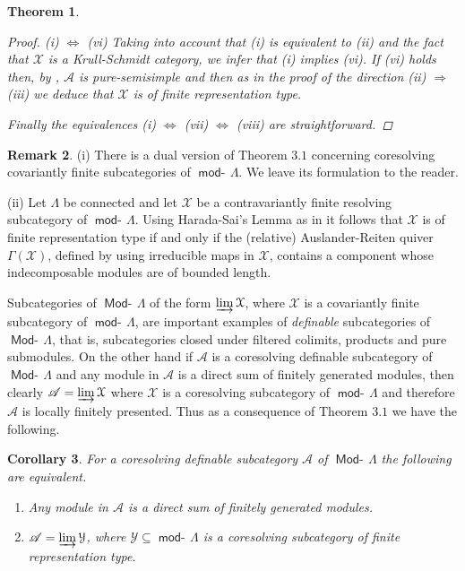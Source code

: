 \documentclass[oneside, a4paper,reqno]{amsart}
\numberwithin{equation}{section}
\newtheorem{thm}{Theorem}[section]
\newtheorem{cor}[thm]{Corollary}
\theoremstyle{definition}
\newtheorem{rem}[thm]{Remark}
\begin{document}
\begin{thm}
\begin{proof}
(i) $\Leftrightarrow$ (vi) Taking into account that  (i) is
equivalent to (ii) and the fact that ${\mathcal X}$ is a Krull-Schmidt
category, we infer that (i) implies (vi). If (vi) holds then, by
\cite[Corollary 2.7]{Krause:memoirs}, ${\mathscr A}$ is pure-semisimple and
then as in the proof of the direction (ii) $\Rightarrow$ (iii) we
deduce that ${\mathcal X}$ is of finite representation type.

Finally the equivalences  (i) $\Leftrightarrow$ (vii)
$\Leftrightarrow$ (viii) are straightforward.
\end{proof}
\end{thm}

\begin{rem} (i) There is a dual version of Theorem $3.1$ concerning
coresolving covariantly finite subcategories of $\operatorname*{\mathsf{mod}-\!}\Lambda$. We
leave its formulation to the reader.

(ii) Let $\Lambda$ be connected and let ${\mathcal X}$ be a contravariantly
finite resolving subcategory of $\operatorname*{\mathsf{mod}-\!}\Lambda$. Using Harada-Sai's
Lemma as in \cite{Ringel:quasi} it follows that ${\mathcal X}$ is of finite
representation type if and only if the (relative) Auslander-Reiten
quiver $\Gamma({\mathcal X})$, defined by using irreducible maps in ${\mathcal X}$,
contains a component whose indecomposable modules are of bounded
length.
\end{rem}

Subcategories of $\operatorname*{\mathsf{Mod}-\!}\Lambda$ of the form $\operatorname*{\varinjlim}{\mathcal X}$, where ${\mathcal X}$ is
a covariantly finite subcategory of $\operatorname*{\mathsf{mod}-\!}\Lambda$, are important
examples of {\em definable} subcategories of $\operatorname*{\mathsf{Mod}-\!}\Lambda$, that is,
subcategories closed under filtered colimits, products and pure
submodules.  On the other hand if ${\mathscr A}$ is a coresolving definable
subcategory of $\operatorname*{\mathsf{Mod}-\!}\Lambda$ and any module in ${\mathscr A}$ is a direct sum
of finitely generated modules, then clearly ${\mathscr A} = \operatorname*{\varinjlim}{\mathcal X}$ where
${\mathcal X}$ is a coresolving subcategory of $\operatorname*{\mathsf{mod}-\!}\Lambda$ and therefore
${\mathscr A}$ is locally finitely presented. Thus as a consequence of Theorem
$3.1$ we have the following.

\begin{cor} For a coresolving definable subcategory ${\mathscr A}$ of
$\operatorname*{\mathsf{Mod}-\!}\Lambda$ the following are equivalent.
\begin{enumerate}
\item Any module in  ${\mathscr A}$ is a direct sum of finitely generated
modules.
\item ${\mathscr A} = \operatorname*{\varinjlim}{\mathcal Y}$, where ${\mathcal Y} \subseteq \operatorname*{\mathsf{mod}-\!}\Lambda$ is a coresolving subcategory of
finite representation type.
\end{enumerate}
\end{cor}
\end{document}
